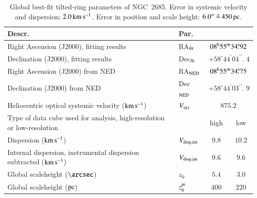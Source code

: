\documentclass[oldversion]{aa}
\newcommand{\hmsm}[4]{{#1}^{\rm h}{#2}^{\rm m}{#3}^{\rm s}\!\!.\:\!{#4}}
\newcommand{\dmsm}[4]{\, {#1}^{\circ}{#2}^{\prime}{#3}^{\prime\prime}\!\!\!.\;\!{#4}}
\begin{document}
\begin{table}[htbp]
\begin{center}
\caption{
Global best-fit tilted-ring parameters of NGC~2685. Error in systemic
velocity and dispersion: $2.0\,{\rm km}\,{\rm s}^{-1}$. Error in
position and scale height: $6.0^{\prime\prime}\,\hat{=}\,450\,\rm
pc$.}
\label{Tab_3}
\begin{tabular}{l l c c}
\hline
\hline
Descr.                                                                            & Par.\\
\hline
Right Ascension (J2000), fitting results                                          & RA$_{\rm fit}$     & \multicolumn{2}{c}{$ \hmsm{08}{55}{34}{92} $} \\
Declination (J2000), fitting results                                              & Dec$_{\rm fit}$    & \multicolumn{2}{c}{$ \dmsm{+58}{44}{04}{4} $} \\
Right Ascension (J2000) from NED                                                  & RA$_{\rm NED}$     & \multicolumn{2}{c}{$ \hmsm{08}{55}{34}{75} $} \\
Declination (J2000) from NED                                                      & Dec$_{\rm NED}$    & \multicolumn{2}{c}{$ \dmsm{+58}{44}{03}{9} $} \\
Heliocentric optical systemic velocity (${\rm km}\,{\rm s}^{-1}$)                 & $V_{\rm sys}$      & \multicolumn{2}{c}{$ 875.2 $}                 \\
Type of data cube used for analysis, high-resolution or low-resolution            &                    & high                  & low                     \\
Dispersion (${\rm km}\,{\rm s}^{-1}$)                                             & $V_{\rm disp,tot}$ & $ 9.8  $              & $ 10.2 $                \\
Internal dispersion, instrumental dispersion subtracted (${\rm km}\,{\rm s}^{-1}$)& $V_{\rm disp,int}$ & $ 9.6  $              & $ 9.6  $                \\
Global scaleheight ($\arcsec$)                                                    & $z_0$              & $ 5.4  $              & $ 3.0  $                \\
Global scaleheight ($\rm pc$)                                                     & $z_0^{\rm pc}$     & $ 400  $              & $ 220  $                \\
\hline                  
\end{tabular}
\end{center}
\end{table}
\end{document}
